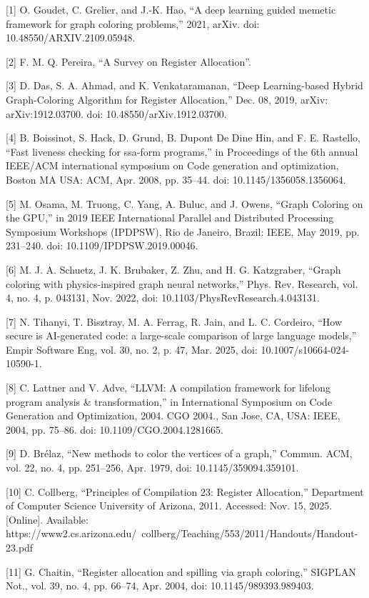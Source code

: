 \documentclass{article}
\begin{document}
{
[1] O. Goudet, C. Grelier, and J.-K. Hao, “A deep learning guided memetic framework for graph coloring problems,” 2021, arXiv. doi: 10.48550/ARXIV.2109.05948.

[2] F. M. Q. Pereira, “A Survey on Register Allocation”.

[3] D. Das, S. A. Ahmad, and K. Venkataramanan, “Deep Learning-based Hybrid Graph-Coloring Algorithm for Register Allocation,” Dec. 08, 2019, arXiv: arXiv:1912.03700. doi: 10.48550/arXiv.1912.03700.

[4] B. Boissinot, S. Hack, D. Grund, B. Dupont De Dine Hin, and F. E. Rastello, “Fast liveness checking for ssa-form programs,” in Proceedings of the 6th annual IEEE/ACM international symposium on Code generation and optimization, Boston MA USA: ACM, Apr. 2008, pp. 35–44. doi: 10.1145/1356058.1356064.

[5] M. Osama, M. Truong, C. Yang, A. Buluc, and J. Owens, “Graph Coloring on the GPU,” in 2019 IEEE International Parallel and Distributed Processing Symposium Workshops (IPDPSW), Rio de Janeiro, Brazil: IEEE, May 2019, pp. 231–240. doi: 10.1109/IPDPSW.2019.00046.

[6] M. J. A. Schuetz, J. K. Brubaker, Z. Zhu, and H. G. Katzgraber, “Graph coloring with physics-inspired graph neural networks,” Phys. Rev. Research, vol. 4, no. 4, p. 043131, Nov. 2022, doi: 10.1103/PhysRevResearch.4.043131.

[7] N. Tihanyi, T. Bisztray, M. A. Ferrag, R. Jain, and L. C. Cordeiro, “How secure is AI-generated code: a large-scale comparison of large language models,” Empir Software Eng, vol. 30, no. 2, p. 47, Mar. 2025, doi: 10.1007/s10664-024-10590-1.

[8] C. Lattner and V. Adve, “LLVM: A compilation framework for lifelong program analysis \& transformation,” in International Symposium on Code Generation and Optimization, 2004. CGO 2004., San Jose, CA, USA: IEEE, 2004, pp. 75–86. doi: 10.1109/CGO.2004.1281665.

[9] D. Brélaz, “New methods to color the vertices of a graph,” Commun. ACM, vol. 22, no. 4, pp. 251–256, Apr. 1979, doi: 10.1145/359094.359101.

[10] C. Collberg, “Principles of Compilation 23: Register Allocation,” Department of Computer Science University of Arizona, 2011. Accessed: Nov. 15, 2025. [Online]. Available: https://www2.cs.arizona.edu/~collberg/Teaching/553/2011/Handouts/Handout-23.pdf

[11] G. Chaitin, “Register allocation and spilling via graph coloring,” SIGPLAN Not., vol. 39, no. 4, pp. 66–74, Apr. 2004, doi: 10.1145/989393.989403.

}
\end{document}
